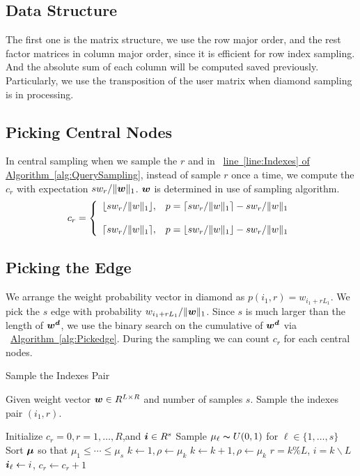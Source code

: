 \documentclass[letterpaper]{article}
\newcommand{\V}[1]{{\bm{{\MakeLowercase{#1}}}}}
\newcommand{\norm}[2]{\|#1\|_{#2}}
\newcommand{\Alg}[1] {\hyperref[alg:#1] {Algorithm~\ref*{alg:#1}}}
\newcommand{\AlgLine}[2]{\hyperref[alg:#1]{line~\ref*{line:#2} of Algorithm~\ref*{alg:#1}}}
\begin{document}
\subsection{Data Structure}
The first one is the matrix structure, we use the row major order, and the rest factor matrices in column major order, since it is efficient for row index sampling. And the absolute sum of each column  will be computed saved previously. Particularly, we use the transposition of the user matrix when diamond sampling is in processing.

\subsection{Picking Central Nodes}
In central sampling when we sample the $r$ and in ~\AlgLine{QuerySampling}{Indexes}, instead of sample $r$ once a time, we compute the $c_r$ with expectation $sw_r/\norm{\V{w}}{1}$. $\V{w}$ is determined in use of sampling algorithm.
\begin{equation*}c_r=
    \left\{
      \begin{array}{ll}
        \lfloor sw_r/\norm{w}{1} \rfloor,
        & \hbox{$p=\lceil sw_r/\norm{w}{1} \rceil - sw_r/\norm{w}{1}$} \\\\
        \lceil sw_r/\norm{w}{1} \rceil,
        & \hbox{$p=\lfloor sw_r/\norm{w}{1} \rfloor - sw_r/\norm{w}{1}$}
      \end{array}
    \right.
\end{equation*}

\subsection{Picking the Edge}
We arrange the weight probability vector in diamond as $p(i_1,r) = w_{i_1+rL_1}$.
We pick the $s$ edge with probability  $w_{i_1+rL_1}/\norm{\V{W}}{1}$. Since $s$ is much larger than the length of $\V{w^d}$, we use the binary search on the cumulative of $\V{w^d}$ via ~\Alg{Pickedge}. During the sampling we can count $c_r$ for each central nodes.

\begin{algorithm}[ht]
    \caption{Sample the Indexes Pair}
    \label{alg:Pickedge}
    Given weight vector $\V{W}\in R^{L\times R}$ and number of samples $s$. Sample the indexes pair $(i_1,r)$.
    \begin{algorithmic}[1]
    \State Initialize $c_r=0,r=1,\ldots,R$,and $\V{i}\in R^s$
    \State Sample $\mu_{\ell} \thicksim U(0,1)$ for $\ell \in \{1,\ldots,s\}$
    \State Sort $\V{\mu}$ so that $\mu_1 \leq \cdots\leq\mu_s$
    \State $k \leftarrow 1,\rho \leftarrow \mu_k$
    \State $k \leftarrow k+1,\rho \leftarrow \mu_k$
    \EndWhile
    \State $r = k \% L$, $i = k \backslash L$
    \State $\V{i}_{\ell} \leftarrow i$, $c_r\leftarrow c_r + 1$
    \EndFor
    \end{algorithmic}
\end{algorithm}
\end{document}
